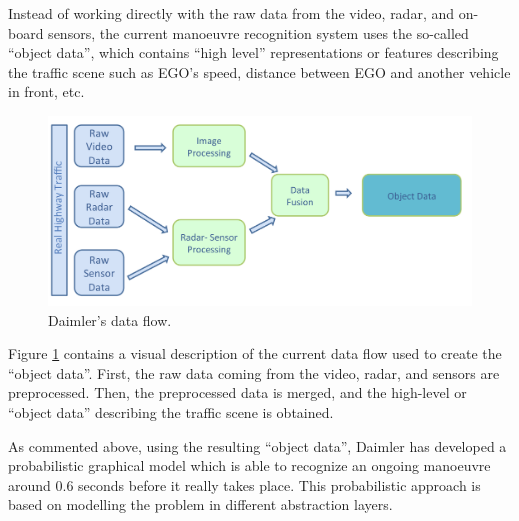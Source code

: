 Instead of working directly with the raw data from the video, radar, and on-board sensors, the current manoeuvre recognition system uses the so-called ``object data'', which contains ``high level'' representations or features describing the traffic scene such as EGO's speed, distance between EGO and another vehicle in front, etc.  

\begin{figure}
\begin{center}
\includegraphics[scale=0.35]{./figures/DaimlerDataFlow}
\caption{\label{Figure:DaimlerDataFlow} Daimler's data flow.}
\end{center}
\end{figure}

Figure \ref{Figure:DaimlerDataFlow} contains a visual description of the current data flow used to create the ``object data''.  First, the raw data coming from the video, radar, and sensors are preprocessed. Then, the preprocessed data is merged, and the high-level or ``object data'' describing the traffic scene is obtained. 

As commented above, using the resulting ``object data'', Daimler has developed a probabilistic graphical model \cite{kasper2012object} which is able to recognize an ongoing manoeuvre around 0.6 seconds before it really takes place.  This probabilistic approach is based on modelling the problem in different abstraction layers. 


%
%
%

